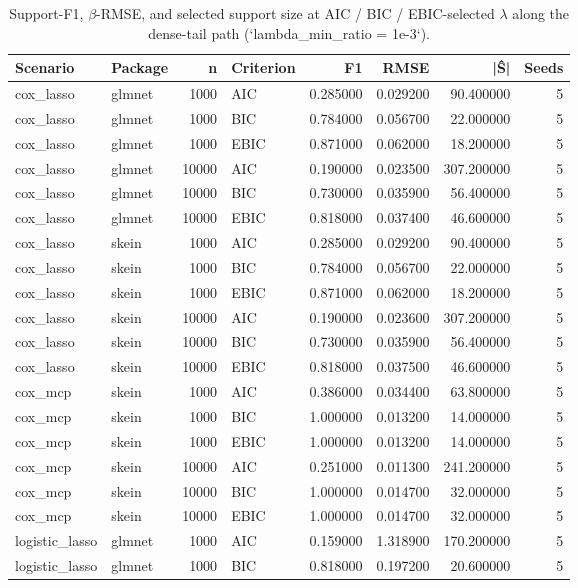\begin{table}[t]
  \centering
  \caption{Support-F1, $\beta$-RMSE, and selected support size at AIC / BIC / EBIC-selected $\lambda$ along the dense-tail path (`lambda_min_ratio = 1e-3`).}
  \label{tab:recovery}
\begin{tabular}{llrlrrrr}
\toprule
Scenario & Package & n & Criterion & F1 & RMSE & |Ŝ| & Seeds \\
\midrule
cox_lasso & glmnet & 1000 & AIC & 0.285000 & 0.029200 & 90.400000 & 5 \\
cox_lasso & glmnet & 1000 & BIC & 0.784000 & 0.056700 & 22.000000 & 5 \\
cox_lasso & glmnet & 1000 & EBIC & 0.871000 & 0.062000 & 18.200000 & 5 \\
cox_lasso & glmnet & 10000 & AIC & 0.190000 & 0.023500 & 307.200000 & 5 \\
cox_lasso & glmnet & 10000 & BIC & 0.730000 & 0.035900 & 56.400000 & 5 \\
cox_lasso & glmnet & 10000 & EBIC & 0.818000 & 0.037400 & 46.600000 & 5 \\
cox_lasso & skein & 1000 & AIC & 0.285000 & 0.029200 & 90.400000 & 5 \\
cox_lasso & skein & 1000 & BIC & 0.784000 & 0.056700 & 22.000000 & 5 \\
cox_lasso & skein & 1000 & EBIC & 0.871000 & 0.062000 & 18.200000 & 5 \\
cox_lasso & skein & 10000 & AIC & 0.190000 & 0.023600 & 307.200000 & 5 \\
cox_lasso & skein & 10000 & BIC & 0.730000 & 0.035900 & 56.400000 & 5 \\
cox_lasso & skein & 10000 & EBIC & 0.818000 & 0.037500 & 46.600000 & 5 \\
cox_mcp & skein & 1000 & AIC & 0.386000 & 0.034400 & 63.800000 & 5 \\
cox_mcp & skein & 1000 & BIC & 1.000000 & 0.013200 & 14.000000 & 5 \\
cox_mcp & skein & 1000 & EBIC & 1.000000 & 0.013200 & 14.000000 & 5 \\
cox_mcp & skein & 10000 & AIC & 0.251000 & 0.011300 & 241.200000 & 5 \\
cox_mcp & skein & 10000 & BIC & 1.000000 & 0.014700 & 32.000000 & 5 \\
cox_mcp & skein & 10000 & EBIC & 1.000000 & 0.014700 & 32.000000 & 5 \\
logistic_lasso & glmnet & 1000 & AIC & 0.159000 & 1.318900 & 170.200000 & 5 \\
logistic_lasso & glmnet & 1000 & BIC & 0.818000 & 0.197200 & 20.600000 & 5 \\

\end{tabular}
\end{table}
